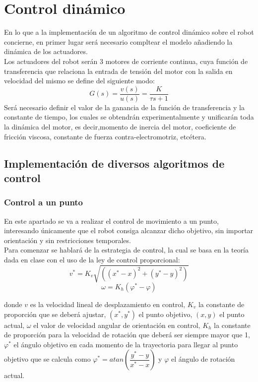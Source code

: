 \documentclass[a4paper,twoside]{article}
\begin{document}
\newpage
\section{Control dinámico}
En lo que a la implementación de un algoritmo de control dinámico sobre el robot concierne, en primer lugar será necesario compltear el modelo añadiendo la dinámica de los actuadores.\\
Los actuadores del robot serán 3 motores de corriente continua, cuya función de transferencia que relaciona la entrada de tensión del motor con la salida en velocidad del mismo se define del siguiente modo:
\begin{equation}
	G(s)=\frac{v(s)}{u(s)}=\frac{K}{\tau s+1}
\end{equation}
Será necesario definir el valor de la ganancia de la función de transferencia y la constante de tiempo, los cuales se obtendrán experimentalmente y unificarán toda la dinámica del motor, es decir,momento de inercia del motor, coeficiente de fricción viscosa, constante de fuerza contra-electromotriz, etcétera.
\subsection{Implementación de diversos algoritmos de control}
	\subsubsection{Control a un punto}
	En este apartado se va a realizar el control de movimiento a un punto, interesando únicamente que el robot consiga alcanzar dicho objetivo, sin importar orientación y sin restricciones temporales.\\
	
	Para comenzar se hablará de la estrategia de control, la cual se basa en la teoría dada en clase con el uso de la ley de control proporcional:\\
	
	\begin{equation}
	v^*=K_v\sqrt{((x^*-x)^2+(y^*-y)^2)}	
	\end{equation}
	\begin{equation}
	\omega=K_h(\varphi^*-\varphi)
	\end{equation}
	
	donde $v$ es la velocidad lineal de desplazamiento en control, $K_v$ la constante de proporción que se deberá ajustar, $(x^*,y^*)$ el punto objetivo, $(x,y)$ el punto actual, $\omega$ el valor de velocidad angular de orientación en control, $K_h$ la constante de proporción para la velocidad de rotación que deberá ser siempre mayor que 1, $\varphi^*$ el ángulo objetivo en cada momento de la trayectoria para llegar al punto objetivo que se calcula como $\varphi^*=atan(\dfrac{y^*-y}{x^*-x})$ y $\varphi$ el ángulo de rotación actual.\\
	
\end{document}
